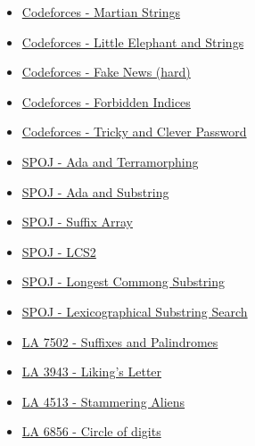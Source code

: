 \begin{itemize}
	\item \href{http://codeforces.com/problemset/problem/149/E}{Codeforces - Martian Strings}
	\item \href{http://codeforces.com/problemset/problem/204/E}{Codeforces - Little Elephant and Strings}
	\item \href{http://codeforces.com/contest/802/problem/I}{Codeforces - Fake News (hard)}
	\item \href{http://codeforces.com/contest/873/problem/F}{Codeforces - Forbidden Indices}
	\item \href{http://codeforces.com/contest/30/problem/E}{Codeforces - Tricky and Clever Password}
	\item \href{http://www.spoj.com/problems/ADAPHOTO/}{SPOJ - Ada and Terramorphing}
	\item \href{http://www.spoj.com/problems/ADASTRNG/}{SPOJ - Ada and Substring}
	\item \href{http://www.spoj.com/problems/SARRAY/}{SPOJ - Suffix Array}
	\item \href{http://www.spoj.com/problems/LCS2/}{SPOJ - LCS2}
	\item \href{http://www.spoj.com/problems/LONGCS/}{SPOJ - Longest Commong Substring}
	\item \href{http://www.spoj.com/problems/SUBLEX/}{SPOJ - Lexicographical Substring Search}
	\item \href{https://vjudge.net/problem/UVALive-7502}{LA 7502 - Suffixes and Palindromes}
	\item \href{https://vjudge.net/problem/UVALive-3943}{LA 3943 - Liking's Letter}
	\item \href{https://vjudge.net/problem/UVALive-4513}{LA 4513 - Stammering Aliens}
	\item \href{https://vjudge.net/problem/UVALive-6856}{LA 6856 - Circle of digits}
\end{itemize}